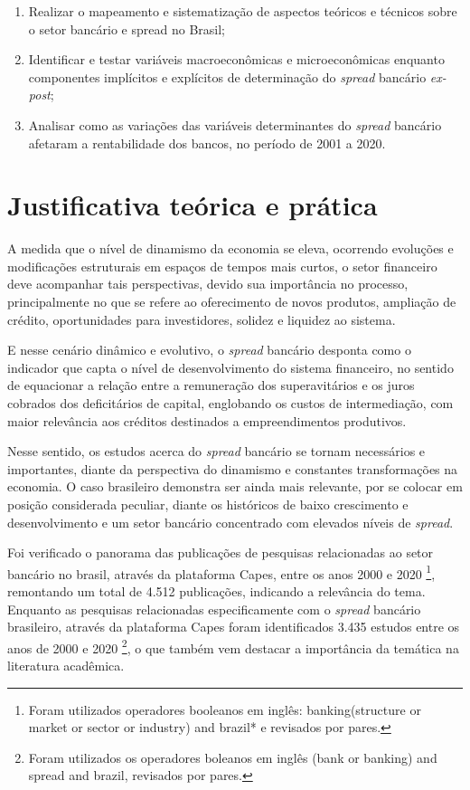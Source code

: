 \documentclass[
  12pt,
  12pt,
  openright,
  oneside,
  a4paper,
  chapter=TITLE,
  section=TITLE,
  subsection=TITLE,
  subsubsection=TITLE,
  english,
  portugues,
  sumario=tradicional]{abntex2}
\providecommand{\tightlist}{%
  \setlength{\itemsep}{0pt}\setlength{\parskip}{0pt}}
\begin{document}
\begin{enumerate}
\def\labelenumi{\arabic{enumi}.}
\tightlist
\item
  Realizar o mapeamento e sistematização de aspectos teóricos e técnicos sobre o setor bancário e spread no Brasil;
\item
  Identificar e testar variáveis macroeconômicas e microeconômicas enquanto componentes implícitos e explícitos de determinação do \emph{spread} bancário \emph{ex-post};
\item
  Analisar como as variações das variáveis determinantes do \emph{spread} bancário afetaram a rentabilidade dos bancos, no período de 2001 a 2020.
\end{enumerate}

\section{Justificativa teórica e prática}

A medida que o nível de dinamismo da economia se eleva, ocorrendo evoluções e modificações estruturais em espaços de tempos mais curtos, o setor financeiro deve acompanhar tais perspectivas, devido sua importância no processo, principalmente no que se refere ao oferecimento de novos produtos, ampliação de crédito, oportunidades para investidores, solidez e liquidez ao sistema.

E nesse cenário dinâmico e evolutivo, o \emph{spread} bancário desponta como o indicador que capta o nível de desenvolvimento do sistema financeiro, no sentido de equacionar a relação entre a remuneração dos superavitários e os juros cobrados dos deficitários de capital, englobando os custos de intermediação, com maior relevância aos créditos destinados a empreendimentos produtivos.

Nesse sentido, os estudos acerca do \emph{spread} bancário se tornam necessários e importantes, diante da perspectiva do dinamismo e constantes transformações na economia. O caso brasileiro demonstra ser ainda mais relevante, por se colocar em posição considerada peculiar, diante os históricos de baixo crescimento e desenvolvimento e um setor bancário concentrado com elevados níveis de \emph{spread}.

Foi verificado o panorama das publicações de pesquisas relacionadas ao setor bancário no brasil, através da plataforma Capes, entre os anos 2000 e 2020
\footnote{Foram utilizados operadores booleanos em inglês: banking(structure or
market or sector or industry) and brazil* e revisados por pares.}, remontando um total de 4.512 publicações, indicando a relevância do tema. Enquanto as pesquisas relacionadas especificamente com o \emph{spread} bancário brasileiro, através da plataforma Capes foram identificados 3.435 estudos entre os anos de 2000 e 2020 \footnote{Foram utilizados os operadores boleanos em
inglês (bank or banking) and spread and brazil, revisados por pares.}, o que também vem destacar a importância da temática na literatura acadêmica.
\end{document}
